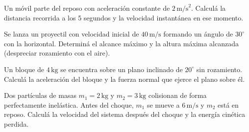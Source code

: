 \documentclass[11pt]{article}
\begin{document}
\thispagestyle{fancy}
\encabezadoExamen

\begin{pregunta}[25 puntos]
Un móvil parte del reposo con aceleración constante de $2\,\text{m/s}^2$. Calculá la distancia recorrida a los 5 segundos y la velocidad instantánea en ese momento.
\end{pregunta}

\begin{pregunta}[25 puntos]
Se lanza un proyectil con velocidad inicial de $40\,\text{m/s}$ formando un ángulo de $30^\circ$ con la horizontal. Determiná el alcance máximo y la altura máxima alcanzada (despreciar rozamiento con el aire).
\end{pregunta}

\begin{pregunta}[25 puntos]
Un bloque de $4\,\text{kg}$ se encuentra sobre un plano inclinado de $20^\circ$ sin rozamiento. Calculá la aceleración del bloque y la fuerza normal que ejerce el plano sobre él.
\end{pregunta}

\begin{pregunta}[25 puntos]
Dos partículas de masas $m_1 = 2\,\text{kg}$ y $m_2 = 3\,\text{kg}$ colisionan de forma perfectamente inelástica. Antes del choque, $m_1$ se mueve a $6\,\text{m/s}$ y $m_2$ está en reposo. Calculá la velocidad del sistema después del choque y la energía cinética perdida.
\end{pregunta}
\end{document}
